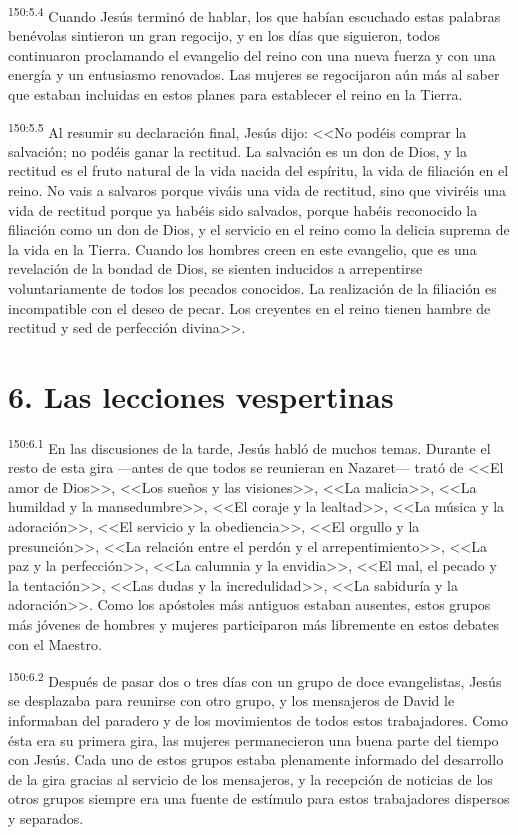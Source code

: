 \par 
\textsuperscript{150:5.4} Cuando Jesús terminó de hablar, los que habían escuchado estas palabras benévolas sintieron un gran regocijo, y en los días que siguieron, todos continuaron proclamando el evangelio del reino con una nueva fuerza y con una energía y un entusiasmo renovados. Las mujeres se regocijaron aún más al saber que estaban incluidas en estos planes para establecer el reino en la Tierra.

\par 
\textsuperscript{150:5.5} Al resumir su declaración final, Jesús dijo: <<No podéis comprar la salvación; no podéis ganar la rectitud. La salvación es un don de Dios, y la rectitud es el fruto natural de la vida nacida del espíritu, la vida de filiación en el reino. No vais a salvaros porque viváis una vida de rectitud, sino que viviréis una vida de rectitud porque ya habéis sido salvados, porque habéis reconocido la filiación como un don de Dios, y el servicio en el reino como la delicia suprema de la vida en la Tierra. Cuando los hombres creen en este evangelio, que es una revelación de la bondad de Dios, se sienten inducidos a arrepentirse voluntariamente de todos los pecados conocidos. La realización de la filiación es incompatible con el deseo de pecar. Los creyentes en el reino tienen hambre de rectitud y sed de perfección divina>>.

\section*{6. Las lecciones vespertinas}
\par 
\textsuperscript{150:6.1} En las discusiones de la tarde, Jesús habló de muchos temas. Durante el resto de esta gira ---antes de que todos se reunieran en Nazaret--- trató de <<El amor de Dios>>, <<Los sueños y las visiones>>, <<La malicia>>, <<La humildad y la mansedumbre>>, <<El coraje y la lealtad>>, <<La música y la adoración>>, <<El servicio y la obediencia>>, <<El orgullo y la presunción>>, <<La relación entre el perdón y el arrepentimiento>>, <<La paz y la perfección>>, <<La calumnia y la envidia>>, <<El mal, el pecado y la tentación>>, <<Las dudas y la incredulidad>>, <<La sabiduría y la adoración>>. Como los apóstoles más antiguos estaban ausentes, estos grupos más jóvenes de hombres y mujeres participaron más libremente en estos debates con el Maestro.

\par 
\textsuperscript{150:6.2} Después de pasar dos o tres días con un grupo de doce evangelistas, Jesús se desplazaba para reunirse con otro grupo, y los mensajeros de David le informaban del paradero y de los movimientos de todos estos trabajadores. Como ésta era su primera gira, las mujeres permanecieron una buena parte del tiempo con Jesús. Cada uno de estos grupos estaba plenamente informado del desarrollo de la gira gracias al servicio de los mensajeros, y la recepción de noticias de los otros grupos siempre era una fuente de estímulo para estos trabajadores dispersos y separados.


